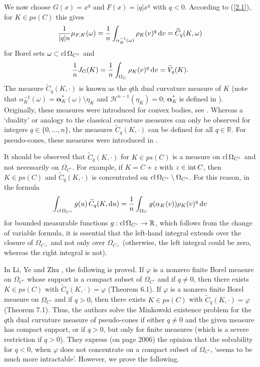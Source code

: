 \documentclass[12pt]{article}
\newcommand{\0}{\mbox{\boldmath$o$}}
\newcommand{\R}{{\mathbb R}}
\newcommand{\Ha}{\mathcal{H}}
\newcommand{\D}{{\rm d}}
\begin{document}
We now choose $G(x)=x^q$ and  $F(x)=|q|x^q$ with $q<0$. According to (\ref{2.1}), for $K\in ps(C)$ this gives
\begin{equation}\label{4.0} 
\frac{1}{|q|n}\mu_{F,K}(\omega)= \frac{1}{n} \int_{\alpha_K^{-1}(\omega)} \rho_K(v)^q\,\D v = \widetilde C_q(K,\omega)
\end{equation}
for Borel sets $\omega\subset {\rm cl} \,\Omega_{C^\circ}$ and
\begin{equation}\label{4.0a}
\frac{1}{n}J_G(K) = \frac{1}{n} \int_{\Omega_C} \rho_K(v)^q\,\D v=\widetilde V_q(K).
\end{equation}
The measure $\widetilde C_q(K,\cdot)$ is known as the $q$th dual curvature measure of $K$ (note that $\alpha_K^{-1}(\omega)= {\boldsymbol\alpha}_K^*(\omega)\setminus\eta_K$ and $\Ha^{n-1}(\eta_K)=0$; ${\boldsymbol\alpha}_K^*$ is defined in \cite[(4.6)]{LYZ24}). Originally, these measures were introduced for convex bodies, see \cite{HLYZ16}.  Whereas a `duality' or analogy to the classical curvature measures can only be observed for integers $q\in\{0,\dots,n\}$, the measures $\widetilde C_q(K,\cdot)$ can be defined for all $q\in\R$. For pseudo-cones, these measures were introduced in \cite{LYZ24}. 

It should be observed  that $\widetilde C_q(K,\cdot)$ for $K\in ps(C)$ is a measure on ${\rm cl}\,\Omega_{C^\circ}$ and not necessarily on $\Omega_{C^\circ}$. For example, if $K=C+z$ with $z\in{\rm int}\,C$, then $K\in ps(C)$ and $\widetilde C_q(K,\cdot)$ is concentrated on ${\rm cl}\,\Omega_{C^\circ}\setminus \Omega_{C^\circ}$. For this reason, in the formula
$$ \int_{{\rm cl}\,\Omega_{C^\circ}} g(u)\,\widetilde C_q(K,\D u) = \frac{1}{n} \int_{\Omega_C} g(\alpha_K(v))\rho_K(v)^q\,\D v$$
for bounded measurable functions $g:{\rm cl}\,\Omega_{C^\circ}\to \R$, which follows from the change of variable formula, it is essential that the left-hand integral extends over the closure of $\Omega_{C\circ}$ and not only over $\Omega_{C\circ}$ (otherwise, the left integral could be zero, whereas the right integral is not).

In Li, Ye and Zhu \cite{LYZ24}, the following is proved. If $\varphi$ is a nonzero finite Borel measure on $\Omega_{C^\circ}$ whose support is a compact subset of $\Omega_{C^\circ}$ and if $q\not= 0$, then there exists $K\in ps(C)$ with $\widetilde C_q(K,\cdot)= \varphi$ (Theorem 6.1). If $\varphi$ is a nonzero finite Borel measure on $\Omega_{C^\circ}$ and if $q>0$, then there exists $K\in ps(C)$ with $\widetilde C_q(K,\cdot)= \varphi$ (Theorem 7.1). Thus, the authors solve the Minkowski existence problem for the $q$th dual curvature measure of pseudo-cones if either $q\not=0$ and the given measure has compact support, or if $q>0$, but only for finite measures (which is a severe restriction if $q>0$). They express (on page 2006) the opinion that the solvability for $q<0$, when $\varphi$ does not concentrate on a compact subset of $\Omega_{C^\circ}$, `seems to be much more intractable'. However, we prove the following.
\end{document}
